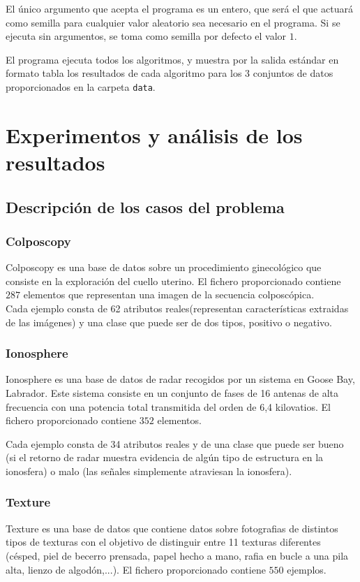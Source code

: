\documentclass[size=a4, parskip=half, titlepage=false, toc=flat, toc=bib, 12pt]{scrartcl}
\begin{document}
El único argumento que acepta el programa es un entero, que será el que actuará como semilla para cualquier valor aleatorio sea necesario en el programa. Si se ejecuta sin argumentos, se toma como semilla por defecto el valor $1$.

El programa ejecuta todos los algoritmos, y muestra por la salida estándar en formato tabla los resultados de cada algoritmo para los 3 conjuntos de datos proporcionados en la carpeta \texttt{data}.

\newpage

\section{Experimentos y análisis de los resultados}
\subsection{Descripción de los casos del problema}
\subsubsection{Colposcopy}
Colposcopy es una base de datos sobre un procedimiento ginecológico que consiste en la exploración del cuello uterino. El fichero proporcionado contiene $287$ elementos que representan una imagen de la secuencia colposcópica.\\

Cada ejemplo consta de 62 atributos reales(representan características extraidas de las imágenes) y una clase que puede ser de dos tipos, positivo o negativo.

\subsubsection{Ionosphere}
Ionosphere es una base de datos de radar recogidos por un sistema en Goose Bay, Labrador. Este sistema consiste en un conjunto de fases de 16 antenas de alta frecuencia con una potencia total transmitida del orden de 6,4 kilovatios. El fichero proporcionado contiene $352$ elementos.

Cada ejemplo consta de 34 atributos reales y de una clase que puede ser bueno (si el retorno de radar muestra evidencia de algún tipo de estructura en la ionosfera) o malo (las señales simplemente atraviesan la ionosfera).

\subsubsection{Texture}
Texture es una base de datos que contiene datos sobre fotografias de distintos tipos de texturas con el objetivo de distinguir entre 11 texturas diferentes (césped, piel de becerro prensada, papel hecho a
mano, rafia en bucle a una pila alta, lienzo de algodón,...). El fichero proporcionado contiene $550$ ejemplos.
\end{document}
